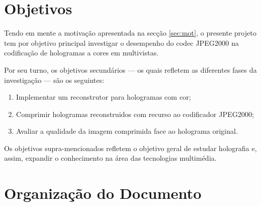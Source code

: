 

\section{Objetivos}
\label{sec:obj}

Tendo em mente a motivação apresentada na secção \ref{sec:mot}, o presente projeto tem por objetivo principal investigar o desempenho do codec JPEG2000 na codificação de hologramas a cores em multivistas.

Por seu turno, os objetivos secundários --- os quais refletem as diferentes fases da investigação --- são os seguintes:

\begin{enumerate}
  \item Implementar um reconstrutor para hologramas com cor;
  \item Comprimir hologramas reconstruidos com recurso ao codificador JPEG2000;
  \item Avaliar a qualidade da imagem comprimida face ao holograma original.
\end{enumerate}

Os objetivos supra-mencionados refletem o objetivo geral de estudar holografia e, assim, expandir o conhecimento na área das tecnologias multimédia.


\section{Organização do Documento}
\label{sec:organ}

\begin{comment}
De modo a refletir o trabalho que foi feito, este documento encontra-se estruturado da seguinte forma:
\begin{enumerate}
\item O primeiro capítulo -- \textbf{Introdução} -- apresenta o projeto, a motivação para a sua escolha, o enquadramento para o mesmo, os seus objetivos e a respetiva organização do documento.
\item O segundo capítulo -- \textbf{Tecnologias Utilizadas} -- descreve os conceitos mais importantes no âmbito deste projeto, bem como as tecnologias utilizadas durante do desenvolvimento da aplicação.
\item ...
\end{enumerate}
\end{comment}

